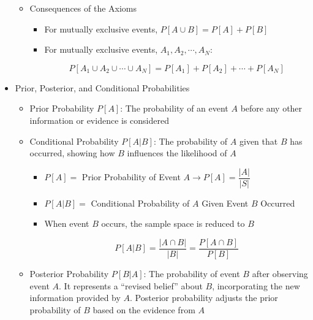 \begin{itemize}
\begin{itemize}
\begin{itemize}
        \end{itemize}

      \item Consequences of the Axioms

        \begin{itemize}

          \item For mutually exclusive events, $P[A\cup B]=P[A]+P[B]$

          \item For mutually exclusive events, $A_1, A_2, \cdots, A_N$:

            $$P[A_1\cup A_2\cup\cdots\cup A_N]=P[A_1]+P[A_2]+\cdots+P[A_N]$$

        \end{itemize}

    \end{itemize}

  \item Prior, Posterior, and Conditional Probabilities

    \begin{itemize}

      \item Prior Probability $P[A]$: The probability of an event $A$ before any other information or evidence is considered

      \item Conditional Probability $P[A|B]$: The probability of $A$ given that $B$ has occurred, showing how $B$ influences the likelihood of $A$

        \begin{itemize}

          \item $P[A]=$ Prior Probability of Event $A\to P[A]=\dfrac{|A|}{|S|}$

          \item $P[A|B]=$ Conditional Probability of $A$ Given Event $B$ Occurred

          \item When event $B$ occurs, the sample space is reduced to $B$

            $$P[A|B]=\frac{|A\cap B|}{|B|}=\frac{P[A\cap B]}{P[B]}$$

        \end{itemize}

      \item Posterior Probability $P[B|A]$: The probability of event $B$ after observing event $A$. It represents a ``revised belief'' about $B$, incorporating the new information provided by $A$. Posterior probability adjusts the prior probability of $B$ based on the evidence from $A$


\end{itemize}
\end{itemize}
